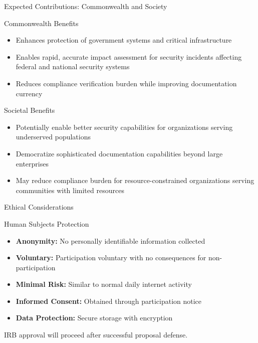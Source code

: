 \documentclass{beamer}
\begin{document}
\begin{frame}[allowframebreaks]{Expected Contributions: Commonwealth and Society}
  \begin{block}{Commonwealth Benefits}
    \begin{itemize}
      \item Enhances protection of government systems and critical infrastructure
      \item Enables rapid, accurate impact assessment for security incidents affecting federal and national security systems
      \item Reduces compliance verification burden while improving documentation currency
    \end{itemize}
  \end{block}
  \begin{block}{Societal Benefits}
    \begin{itemize}
      \item Potentially enable better security capabilities for organizations serving underserved populations
      \item Democratize sophisticated documentation capabilities beyond large enterprises
      \item May reduce compliance burden for resource-constrained organizations serving communities with limited resources
    \end{itemize}
  \end{block}
\end{frame}

\begin{frame}[allowframebreaks]{Ethical Considerations}
  \begin{block}{Human Subjects Protection}
    \begin{itemize}
      \item \textbf{Anonymity:} No personally identifiable information collected
      \item \textbf{Voluntary:} Participation voluntary with no consequences for non-participation
      \item \textbf{Minimal Risk:} Similar to normal daily internet activity
      \item \textbf{Informed Consent:} Obtained through participation notice
      \item \textbf{Data Protection:} Secure storage with encryption
    \end{itemize}
  \end{block}

  \vspace{0.2cm}
  IRB approval will proceed after successful proposal defense.
\end{frame}
\end{document}
